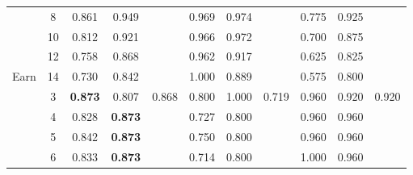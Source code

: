 \begin{table}[]
\begin{tabular}{|c|c|c|c|c|c|c|c|c|c|c|}
                       & 8                     & \cellcolor[HTML]{EFEFEF}0.861          & \cellcolor[HTML]{EFEFEF}0.949          & \cellcolor[HTML]{EFEFEF}      & 0.969    & 0.974    &          & \cellcolor[HTML]{EFEFEF}0.775 & \cellcolor[HTML]{EFEFEF}0.925 & \cellcolor[HTML]{EFEFEF}      \\ \cline{2-11} 
                       & 10                    & \cellcolor[HTML]{EFEFEF}0.812          & \cellcolor[HTML]{EFEFEF}0.921          & \cellcolor[HTML]{EFEFEF}      & 0.966    & 0.972    &          & \cellcolor[HTML]{EFEFEF}0.700 & \cellcolor[HTML]{EFEFEF}0.875 & \cellcolor[HTML]{EFEFEF}      \\ \cline{2-11} 
                       & 12                    & \cellcolor[HTML]{EFEFEF}0.758          & \cellcolor[HTML]{EFEFEF}0.868          & \cellcolor[HTML]{EFEFEF}      & 0.962    & 0.917    &          & \cellcolor[HTML]{EFEFEF}0.625 & \cellcolor[HTML]{EFEFEF}0.825 & \cellcolor[HTML]{EFEFEF}      \\ \cline{2-11} 
\multirow{-9}{*}{Earn} & 14                    & \cellcolor[HTML]{EFEFEF}0.730          & \cellcolor[HTML]{EFEFEF}0.842          & \cellcolor[HTML]{EFEFEF}      & 1.000    & 0.889    &          & \cellcolor[HTML]{EFEFEF}0.575 & \cellcolor[HTML]{EFEFEF}0.800 & \cellcolor[HTML]{EFEFEF}      \\ \hline
                       & 3                     & \cellcolor[HTML]{EFEFEF}\textbf{0.873} & \cellcolor[HTML]{EFEFEF}0.807          & \cellcolor[HTML]{EFEFEF}0.868 & 0.800    & 1.000    & 0.719    & \cellcolor[HTML]{EFEFEF}0.960 & \cellcolor[HTML]{EFEFEF}0.920 & \cellcolor[HTML]{EFEFEF}0.920 \\ \cline{2-11} 
                       & 4                     & \cellcolor[HTML]{EFEFEF}0.828          & \cellcolor[HTML]{EFEFEF}\textbf{0.873} & \cellcolor[HTML]{EFEFEF}      & 0.727    & 0.800    &          & \cellcolor[HTML]{EFEFEF}0.960 & \cellcolor[HTML]{EFEFEF}0.960 & \cellcolor[HTML]{EFEFEF}      \\ \cline{2-11} 
                       & 5                     & \cellcolor[HTML]{EFEFEF}0.842          & \cellcolor[HTML]{EFEFEF}\textbf{0.873} & \cellcolor[HTML]{EFEFEF}      & 0.750    & 0.800    &          & \cellcolor[HTML]{EFEFEF}0.960 & \cellcolor[HTML]{EFEFEF}0.960 & \cellcolor[HTML]{EFEFEF}      \\ \cline{2-11} 
                       & 6                     & \cellcolor[HTML]{EFEFEF}0.833          & \cellcolor[HTML]{EFEFEF}\textbf{0.873} & \cellcolor[HTML]{EFEFEF}      & 0.714    & 0.800    &          & \cellcolor[HTML]{EFEFEF}1.000 & \cellcolor[HTML]{EFEFEF}0.960 & \cellcolor[HTML]{EFEFEF}      \\ \cline{2-11} 

\end{tabular}
\end{table}
